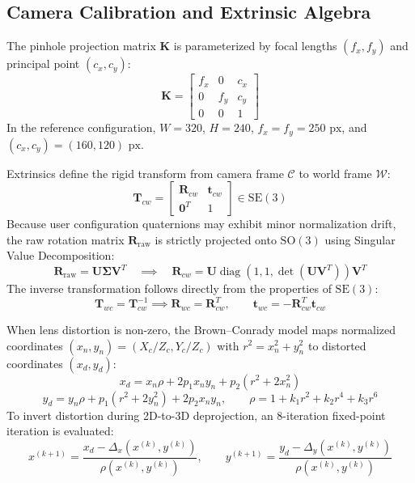 \documentclass[10pt,a4paper]{article}
\begin{document}
\subsection{Camera Calibration and Extrinsic Algebra}
The pinhole projection matrix $\mathbf{K}$ \cite{hartley2004multiple, zhang2000flexible} is parameterized by focal lengths $(f_x, f_y)$ and principal point $(c_x, c_y)$:
\begin{equation}
\mathbf{K} = \begin{bmatrix} f_x & 0 & c_x \\ 0 & f_y & c_y \\ 0 & 0 & 1 \end{bmatrix}
\end{equation}
In the reference configuration, $W=320$, $H=240$, $f_x = f_y = 250\text{ px}$, and $(c_x, c_y) = (160, 120)\text{ px}$.

Extrinsics define the rigid transform from camera frame $\mathcal{C}$ to world frame $\mathcal{W}$:
\begin{equation}
\mathbf{T}_{cw} = \begin{bmatrix} \mathbf{R}_{cw} & \mathbf{t}_{cw} \\ \mathbf{0}^T & 1 \end{bmatrix} \in \mathrm{SE}(3)
\end{equation}
Because user configuration quaternions may exhibit minor normalization drift, the raw rotation matrix $\mathbf{R}_{\mathrm{raw}}$ is strictly projected onto $\mathrm{SO}(3)$ using Singular Value Decomposition:
\begin{equation}
\mathbf{R}_{\mathrm{raw}} = \mathbf{U} \mathbf{\Sigma} \mathbf{V}^T \quad \implies \quad \mathbf{R}_{cw} = \mathbf{U} \operatorname{diag}\left(1, 1, \det(\mathbf{U} \mathbf{V}^T)\right) \mathbf{V}^T
\end{equation}
The inverse transformation follows directly from the properties of $\mathrm{SE}(3)$:
\begin{equation}
\mathbf{T}_{wc} = \mathbf{T}_{cw}^{-1} \implies \mathbf{R}_{wc} = \mathbf{R}_{cw}^T, \qquad \mathbf{t}_{wc} = -\mathbf{R}_{cw}^T \mathbf{t}_{cw}
\end{equation}

When lens distortion is non-zero, the Brown--Conrady model \cite{brown1971close} maps normalized coordinates $(x_n, y_n) = (X_c/Z_c, Y_c/Z_c)$ with $r^2 = x_n^2 + y_n^2$ to distorted coordinates $(x_d, y_d)$:
\begin{equation}
x_d = x_n \rho + 2 p_1 x_n y_n + p_2 (r^2 + 2 x_n^2)
\end{equation}
\begin{equation}
y_d = y_n \rho + p_1 (r^2 + 2 y_n^2) + 2 p_2 x_n y_n, \qquad \rho = 1 + k_1 r^2 + k_2 r^4 + k_3 r^6
\end{equation}
To invert distortion during 2D-to-3D deprojection, an 8-iteration fixed-point iteration is evaluated:
\begin{equation}
x^{(k+1)} = \frac{x_d - \Delta_x(x^{(k)}, y^{(k)})}{\rho(x^{(k)}, y^{(k)})}, \qquad y^{(k+1)} = \frac{y_d - \Delta_y(x^{(k)}, y^{(k)})}{\rho(x^{(k)}, y^{(k)})}
\end{equation}
\end{document}
